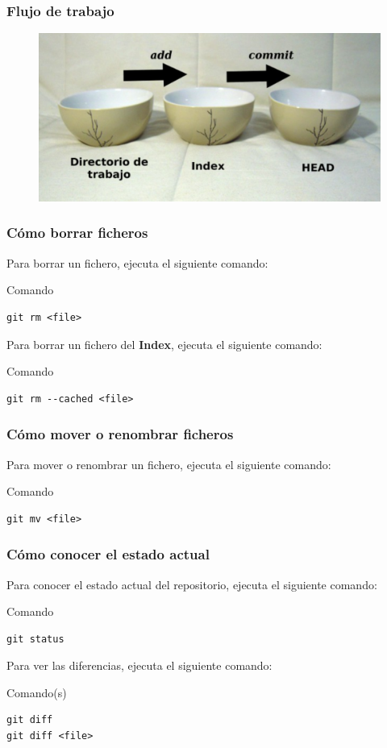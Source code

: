\documentclass{beamer}
\begin{document}
\begin{frame}
\frametitle{Flujo de trabajo}
\begin{figure}
\includegraphics[width=0.8\linewidth]{img/cuencos.png}
\end{figure}
\end{frame}

\begin{frame}[fragile]
\frametitle{Cómo borrar ficheros}
Para borrar un fichero, ejecuta el siguiente comando:
\begin{block}{Comando}
\begin{verbatim}
git rm <file>
\end{verbatim}
\end{block}
\vskip 1.00cm
Para borrar un fichero del \textbf{Index}, ejecuta el siguiente comando:
\begin{block}{Comando}
\begin{verbatim}
git rm --cached <file>
\end{verbatim}
\end{block}
\end{frame}

\begin{frame}[fragile]
\frametitle{Cómo mover o renombrar ficheros}
Para mover o renombrar un fichero, ejecuta el siguiente comando:
\begin{block}{Comando}
\begin{verbatim}
git mv <file>
\end{verbatim}
\end{block}
\end{frame}

\begin{frame}[fragile]
\frametitle{Cómo conocer el estado actual}
Para conocer el estado actual del repositorio, ejecuta el siguiente comando:
\begin{block}{Comando}
\begin{verbatim}
git status
\end{verbatim}
\end{block}
\vskip 1.00cm
Para ver las diferencias, ejecuta el siguiente comando:
\begin{block}{Comando(s)}
\begin{verbatim}
git diff
git diff <file>
\end{verbatim}
\end{block}
\end{frame}
\end{document}
